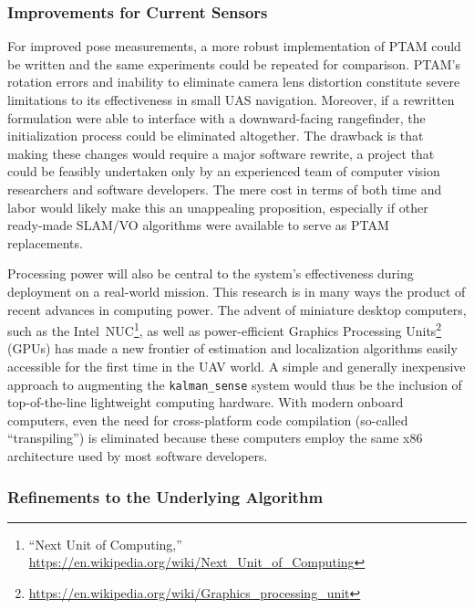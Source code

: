 \subsubsection{Improvements for Current Sensors}

For improved pose measurements, a more robust implementation of PTAM could be written and the same experiments could be repeated for comparison. PTAM's rotation errors and inability to eliminate camera lens distortion constitute severe limitations to its effectiveness in small UAS navigation. Moreover, if a rewritten formulation were able to interface with a downward-facing rangefinder, the initialization process could be eliminated altogether. The drawback is that making these changes would require a major software rewrite, a project that could be feasibly undertaken only by an experienced team of computer vision researchers and software developers. The mere cost in terms of both time and labor would likely make this an unappealing proposition, especially if other ready-made SLAM/VO algorithms were available to serve as PTAM replacements.

Processing power will also be central to the system's effectiveness during deployment on a real-world mission. This research is in many ways the product of recent advances in computing power. The advent of miniature desktop computers, such as the Intel~NUC\footnote{``Next Unit of Computing,'' \url{https://en.wikipedia.org/wiki/Next_Unit_of_Computing}}, as well as power-efficient Graphics Processing Units\footnote{\url{https://en.wikipedia.org/wiki/Graphics_processing_unit}} (GPUs) has made a new frontier of estimation and localization algorithms easily accessible for the first time in the UAV world. A simple and generally inexpensive approach to augmenting the \texttt{kalman\_sense} system would thus be the inclusion of top-of-the-line lightweight computing hardware. With modern onboard computers, even the need for cross-platform code compilation (so-called ``transpiling'') is eliminated because these computers employ the same x86 architecture used by most software developers.

\subsubsection{Refinements to the Underlying Algorithm}

